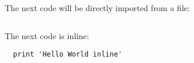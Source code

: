 \documentclass{article}
\begin{document}
The next code will be directly imported from a file:
 
\inputminted{python}{example.py}

The next code is inline:

\begin{verbatim}
  print 'Hello World inline'
\end{verbatim}
\end{document}
